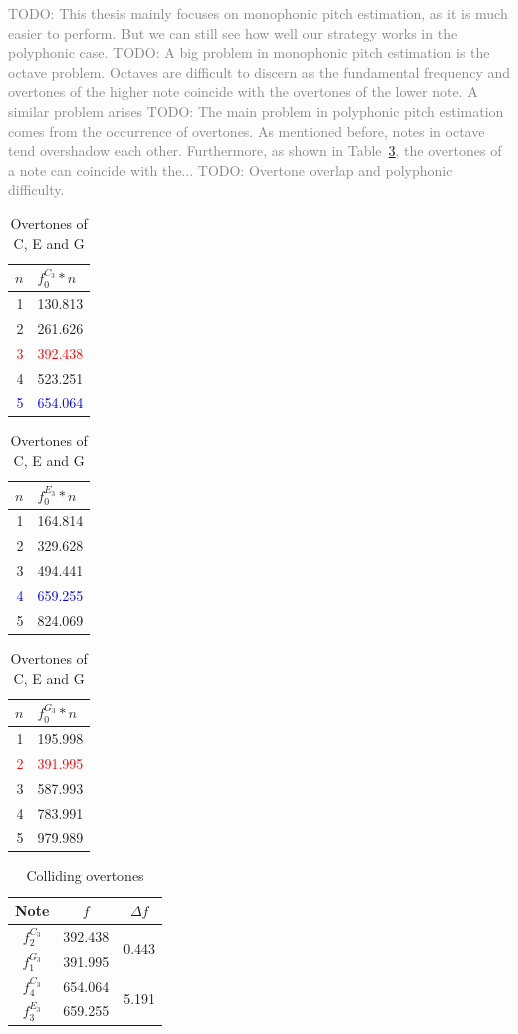 \documentclass[10pt,twocolumn]{article}
\begin{document}
\textcolor{gray}{TODO: This thesis mainly focuses on monophonic pitch estimation, as it is much easier to perform. But we can still see how well our strategy works in the polyphonic case.
TODO: A big problem in monophonic pitch estimation is the octave problem. Octaves are difficult to discern as the fundamental frequency and overtones of the higher note coincide with the overtones of the lower note. A similar problem arises
TODO: The main problem in polyphonic pitch estimation comes from the occurrence of overtones. As mentioned before, notes in octave tend overshadow each other. Furthermore, as shown in Table~\ref{tab:overtones}, the overtones of a note can coincide with the...
TODO: Overtone overlap and polyphonic difficulty.}
\begin{table}[h]
    \centering
    \hfill
    \begin{tabular}{r|l}
        $n$ & $f^{C_3}_0*n$ \\
        \hline
        1 & 130.813 \\
        2 & 261.626 \\
        \textcolor{red}{3} & \textcolor{red}{392.438} \\
        4 & 523.251 \\
        \textcolor{blue}{5} & \textcolor{blue}{654.064}
    \end{tabular}
    \hfill
    \begin{tabular}{r|l}
        $n$ & $f^{E_3}_0*n$ \\
        \hline
        1 & 164.814 \\
        2 & 329.628 \\
        3 & 494.441 \\
        \textcolor{blue}{4} & \textcolor{blue}{659.255} \\
        5 & 824.069
    \end{tabular}
    \hfill
    \begin{tabular}{r|l}
        $n$ & $f^{G_3}_0*n$ \\
        \hline
        1 & 195.998 \\
        \textcolor{red}{2} & \textcolor{red}{391.995} \\
        3 & 587.993 \\
        4 & 783.991 \\
        5 & 979.989
    \end{tabular}
    \hfill
    \caption{Overtones of C, E and G}
    \label{tab:overtones}
\end{table}
\begin{table}[h]
    \centering
    \begin{tabular}{c|c|c}
        Note & $f$ & $\Delta f$ \\
        \hline
        $f^{C_3}_2$ & 392.438 & \multirow{2}{*}{0.443} \\
        $f^{G_3}_1$ & 391.995 & \\
        \hline
        $f^{C_3}_4$ & 654.064 & \multirow{2}{*}{5.191} \\
        $f^{E_3}_3$ & 659.255 &
    \end{tabular}
    \caption{Colliding overtones}
    \label{tab:diff}
\end{table}
\end{document}
